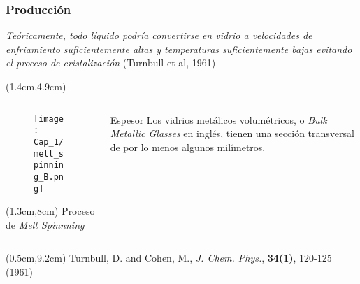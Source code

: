 \begin{frame}
 \frametitle{Producci\'on}
 \vspace{-0.15cm}
 \begin{block}{}
    \textit{Te\'oricamente, todo l\'iquido podr\'ia convertirse en vidrio a velocidades de enfriamiento suficientemente altas y temperaturas suficientemente bajas evitando el proceso de cristalizaci\'on} (Turnbull et al, 1961)
 \end{block}
 
 \begin{textblock*}{10cm}(1.4cm,4.9cm)
  \begin{columns}
    \begin{column}{4cm}
      \begin{figure}
	\texttt{[image: Cap\_1/melt\_spinning\_B.png]}
      \end{figure} 
      \begin{textblock*}{4cm}(1.3cm,8cm)
	\scriptsize{Proceso de \textit{Melt Spinnning}}
      \end{textblock*}
    \end{column}
    \begin{column}{6cm}
    \begin{alertblock}{Espesor}
	Los vidrios met\'alicos volum\'etricos, o \textit{Bulk Metallic Glasses} en ingl\'es, tienen una secci\'on transversal de por lo menos algunos mil\'imetros.
    \end{alertblock}
    \end{column}
  \end{columns}
 \end{textblock*}
 \begin{textblock*}{12.6cm}(0.5cm,9.2cm)
  \scriptsize{Turnbull, D. and Cohen, M., \textit{J. Chem. Phys.}, \textbf{34(1)}, 120-125 (1961)}
  \end{textblock*}
\end{frame}

